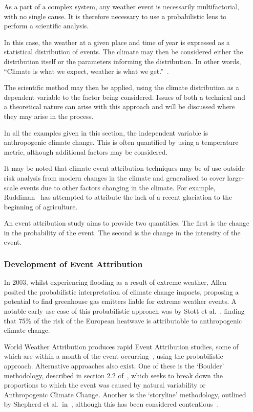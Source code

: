 As a part of a complex system,
    any weather event is necessarily multifactorial,
    with no single cause.
It is therefore necessary to use a probabilistic lens to perform a scientific analysis.

In this case, the weather at a given place and time of year is expressed as a statistical distribution of events.
The climate may then be considered either the distribution itself
    or the parameters informing the distribution.
In other words, ``Climate is what we expect, weather is what we get.''~\cite{Herbertson_1935}.

The scientific method may then be applied,
    using the climate distribution as a dependent variable to the factor being considered.
Issues of both a technical and a theoretical nature can arise with this approach
    and will be discussed where they may arise in the process.

In all the examples given in this section,
    the independent variable is anthropogenic climate change.
This is often quantified by using a temperature metric,
    although additional factors may be considered.

It may be noted that
    climate event attribution techniques may be of use outside risk analysis from modern changes in the climate
    and generalised to cover large-scale events due to other factors changing in the climate.
For example,
    Ruddiman~\cite{Ruddiman_2010} has attempted to attribute the lack of a recent glaciation to the beginning of agriculture.

An event attribution study aims to provide two quantities.
The first is the change in the probability of the event.
The second is the change in the intensity of the event.

\subsubsection{Development of Event Attribution}

In 2003, whilst experiencing flooding as a result of extreme weather,
    Allen~\cite{Allen_2003} posited the probabilistic interpretation of climate change impacts,
    proposing a potential to find greenhouse gas emitters liable for extreme weather events.
A notable early use case of this probabilistic approach was by Stott et al.~\cite{Stott_2004},
    finding that 75\% of the risk of the European heatwave is attributable to anthropogenic climate change.

World Weather Attribution produces rapid Event Attribution studies,
    some of which are within a month of the event occurring~\cite{van_Oldenborgh_et_al_2018},
    using the probabilistic approach.
Alternative approaches also exist.
One of these is the `Boulder' methodology,
    described in section 2.2 of~\cite{Otto_2017},
    which seeks to break down the proportions to which the event was caused by natural variability or Anthropogenic Climate Change.
Another is the `storyline' methodology,
    outlined by Shepherd et al.\ in~\cite{Shepherd_et_al_2018},
    although this has been considered contentious~\cite{García-Portela_Maraun_2023}.

